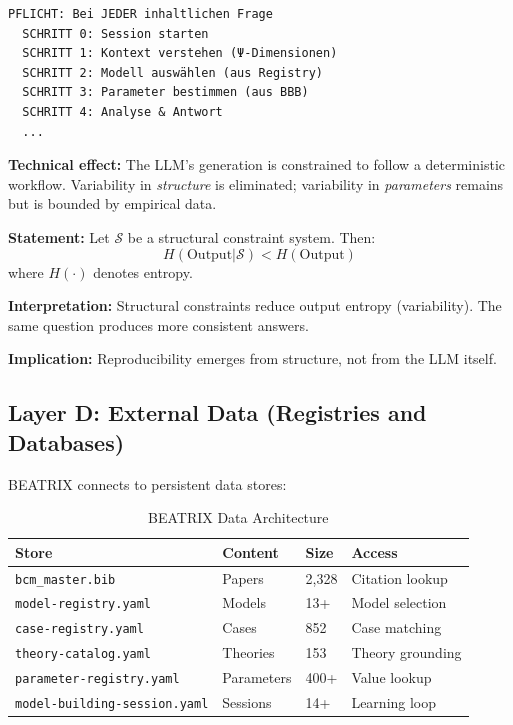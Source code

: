 \begin{verbatim}
PFLICHT: Bei JEDER inhaltlichen Frage
  SCHRITT 0: Session starten
  SCHRITT 1: Kontext verstehen (Ψ-Dimensionen)
  SCHRITT 2: Modell auswählen (aus Registry)
  SCHRITT 3: Parameter bestimmen (aus BBB)
  SCHRITT 4: Analyse & Antwort
  ...
\end{verbatim}

\textbf{Technical effect:} The LLM's generation is constrained to follow a deterministic workflow. Variability in \textit{structure} is eliminated; variability in \textit{parameters} remains but is bounded by empirical data.

\begin{tcolorbox}[colback=gray!5!white, colframe=gray!75!black,
    title=Axiom UNMAPPED_BX-1: Structural Constraint]
\textbf{Statement:} Let $\mathcal{S}$ be a structural constraint system. Then:
\begin{equation}
H(\text{Output} | \mathcal{S}) < H(\text{Output})
\end{equation}
where $H(\cdot)$ denotes entropy.

\textbf{Interpretation:} Structural constraints reduce output entropy (variability). The same question produces more consistent answers.

\textbf{Implication:} Reproducibility emerges from structure, not from the LLM itself.
\end{tcolorbox}


\subsection{Layer D: External Data (Registries and Databases)}

BEATRIX connects to persistent data stores:

\begin{table}[htbp]
\centering
\caption{BEATRIX Data Architecture}
\label{tab:bx-data}
\renewcommand{\arraystretch}{1.3}
\begin{tabular}{@{}llll@{}}
\toprule
\textbf{Store} & \textbf{Content} & \textbf{Size} & \textbf{Access} \\
\midrule
\texttt{bcm\_master.bib} & Papers & 2,328 & Citation lookup \\
\texttt{model-registry.yaml} & Models & 13+ & Model selection \\
\texttt{case-registry.yaml} & Cases & 852 & Case matching \\
\texttt{theory-catalog.yaml} & Theories & 153 & Theory grounding \\
\texttt{parameter-registry.yaml} & Parameters & 400+ & Value lookup \\
\texttt{model-building-session.yaml} & Sessions & 14+ & Learning loop \\
\bottomrule
\end{tabular}
\end{table}

